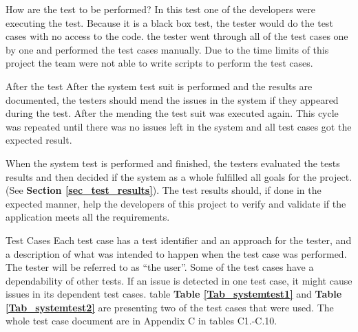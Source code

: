 {{How are the test to be performed? \newline
In this test one of the developers were executing the test. Because it is a black box test, the tester would do the test cases with no access to the code. the tester went through all of the test cases one by one and performed the test cases manually. Due to the time limits of this project the team were not able to write scripts to perform the test cases. \newline

After the test\newline
After the system test suit is performed and the results are documented, the testers should mend the issues in the system if they appeared during the test. After the mending the test suit was executed again. This cycle was repeated until there was no issues left in the system and all test cases got the expected result.\newline

When the system test is performed and finished, the testers evaluated the tests results and then decided if the system as a whole fulfilled all goals for the project.(See \textbf{Section \ref{sec_test_results}}). The test results should, if done in the expected manner, help the developers of this project to verify and validate if the application meets all the requirements.\newline

Test Cases \newline
Each test case has a test identifier and an approach for the tester, and a description of what was intended to happen when the test case was performed. The tester will be referred to as “the user”. Some of the test cases have a dependability of other tests. If an issue is detected in one test case, it might cause issues in its dependent test cases. table \textbf{Table \ref{Tab_systemtest1}} and \textbf{Table \ref{Tab_systemtest2}} are presenting two of the test cases that were used. The whole test case document are in Appendix C in tables C1.-C.10. 

}}
